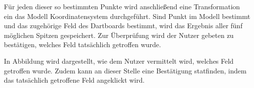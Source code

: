Für jeden dieser so bestimmten Punkte wird anschließend eine Transformation ein das Modell Koordinatensystem durchgeführt. 
Sind Punkt im Modell bestimmt und das zugehörige Feld des Dartboards bestimmt, wird das Ergebnis aller fünf möglichen Spitzen gespeichert. Zur Überprüfung wird der Nutzer gebeten zu bestätigen, welches Feld tatsächlich getroffen wurde. 

In Abbildung  wird dargestellt, wie dem Nutzer vermittelt wird, welches Feld getroffen wurde. Zudem kann an dieser Stelle eine Bestätigung statfinden, indem das tatsächlich getroffene Feld angeklickt wird.


